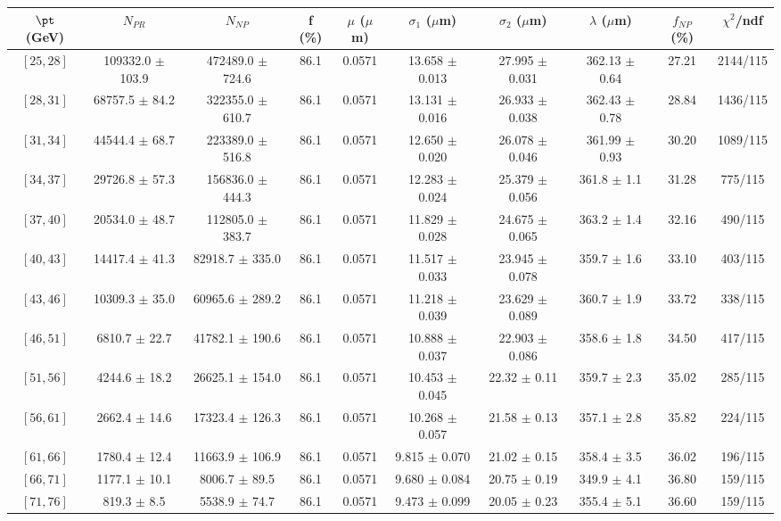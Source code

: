 \begin{tabular}{c||c|c|c|c|c|c|c||c|c}
$\pt$ (GeV) & $N_{PR}$ & $N_{NP}$ & f (\%) & $\mu$ ($\mu$m) & $\sigma_1$ ($\mu$m) & $\sigma_2$ ($\mu$m)  & $\lambda$ ($\mu$m) & $f_{NP}$ (\%) & $\chi^2$/ndf \\
\hline
$[25, 28]$ & 109332.0 $\pm$ 103.9 & 472489.0 $\pm$ 724.6 & 86.1 & 0.0571 & 13.658 $\pm$ 0.013 & 27.995 $\pm$ 0.031 & 362.13 $\pm$ 0.64 & 27.21 & 2144/115\\
$[28, 31]$ & 68757.5 $\pm$ 84.2 & 322355.0 $\pm$ 610.7 & 86.1 & 0.0571 & 13.131 $\pm$ 0.016 & 26.933 $\pm$ 0.038 & 362.43 $\pm$ 0.78 & 28.84 & 1436/115\\
$[31, 34]$ & 44544.4 $\pm$ 68.7 & 223389.0 $\pm$ 516.8 & 86.1 & 0.0571 & 12.650 $\pm$ 0.020 & 26.078 $\pm$ 0.046 & 361.99 $\pm$ 0.93 & 30.20 & 1089/115\\
$[34, 37]$ & 29726.8 $\pm$ 57.3 & 156836.0 $\pm$ 444.3 & 86.1 & 0.0571 & 12.283 $\pm$ 0.024 & 25.379 $\pm$ 0.056 & 361.8 $\pm$ 1.1 & 31.28 & 775/115\\
$[37, 40]$ & 20534.0 $\pm$ 48.7 & 112805.0 $\pm$ 383.7 & 86.1 & 0.0571 & 11.829 $\pm$ 0.028 & 24.675 $\pm$ 0.065 & 363.2 $\pm$ 1.4 & 32.16 & 490/115\\
$[40, 43]$ & 14417.4 $\pm$ 41.3 & 82918.7 $\pm$ 335.0 & 86.1 & 0.0571 & 11.517 $\pm$ 0.033 & 23.945 $\pm$ 0.078 & 359.7 $\pm$ 1.6 & 33.10 & 403/115\\
$[43, 46]$ & 10309.3 $\pm$ 35.0 & 60965.6 $\pm$ 289.2 & 86.1 & 0.0571 & 11.218 $\pm$ 0.039 & 23.629 $\pm$ 0.089 & 360.7 $\pm$ 1.9 & 33.72 & 338/115\\
$[46, 51]$ & 6810.7 $\pm$ 22.7 & 41782.1 $\pm$ 190.6 & 86.1 & 0.0571 & 10.888 $\pm$ 0.037 & 22.903 $\pm$ 0.086 & 358.6 $\pm$ 1.8 & 34.50 & 417/115\\
$[51, 56]$ & 4244.6 $\pm$ 18.2 & 26625.1 $\pm$ 154.0 & 86.1 & 0.0571 & 10.453 $\pm$ 0.045 & 22.32 $\pm$ 0.11 & 359.7 $\pm$ 2.3 & 35.02 & 285/115\\
$[56, 61]$ & 2662.4 $\pm$ 14.6 & 17323.4 $\pm$ 126.3 & 86.1 & 0.0571 & 10.268 $\pm$ 0.057 & 21.58 $\pm$ 0.13 & 357.1 $\pm$ 2.8 & 35.82 & 224/115\\
$[61, 66]$ & 1780.4 $\pm$ 12.4 & 11663.9 $\pm$ 106.9 & 86.1 & 0.0571 & 9.815 $\pm$ 0.070 & 21.02 $\pm$ 0.15 & 358.4 $\pm$ 3.5 & 36.02 & 196/115\\
$[66, 71]$ & 1177.1 $\pm$ 10.1 & 8006.7 $\pm$ 89.5 & 86.1 & 0.0571 & 9.680 $\pm$ 0.084 & 20.75 $\pm$ 0.19 & 349.9 $\pm$ 4.1 & 36.80 & 159/115\\
$[71, 76]$ & 819.3 $\pm$ 8.5 & 5538.9 $\pm$ 74.7 & 86.1 & 0.0571 & 9.473 $\pm$ 0.099 & 20.05 $\pm$ 0.23 & 355.4 $\pm$ 5.1 & 36.60 & 159/115\\

\end{tabular}
